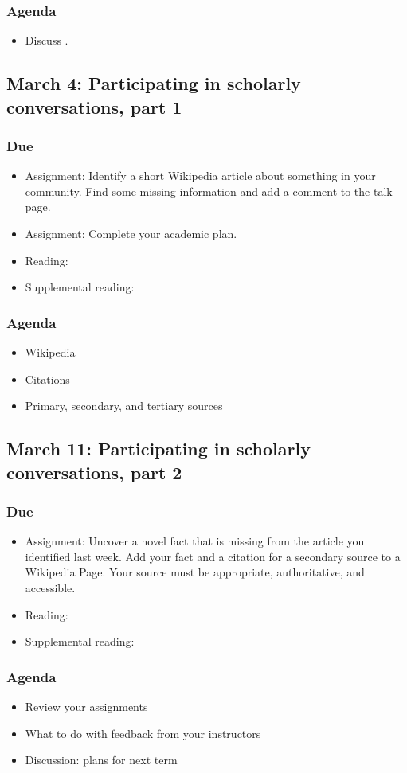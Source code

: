 \documentclass[12pt,article,oneside]{memoir}
\begin{document}
\subsubsection{Agenda}
\begin{itemize}
\item Discuss \cite{guillory2008s}.
\end{itemize}



\subsection{March 4: Participating in scholarly conversations, part 1}
\subsubsection{Due}
\begin{itemize}
 \item Assignment: Identify a short Wikipedia article about something in your community.  Find some missing information and add a comment to the talk page.
 \item Assignment: Complete your academic plan.
 \item Reading: \cite{eval}
 \item Supplemental reading: \cite{training}
\end{itemize}

\subsubsection{Agenda}
\begin{itemize}
\item Wikipedia
\item Citations
\item Primary, secondary, and tertiary sources
\end{itemize}


\subsection{March 11: Participating in scholarly conversations, part 2}
\subsubsection{Due}
\begin{itemize}
 \item Assignment: Uncover a novel fact that is missing from the article you identified last week.  Add your fact and a citation for a secondary source to a Wikipedia Page.  Your source must be appropriate, authoritative, and accessible.
 \item Reading: \cite{eryk}
 \item Supplemental reading: \cite{doyle}
\end{itemize}

\subsubsection{Agenda}
\begin{itemize}
\item Review your assignments
\item What to do with feedback from your instructors
\item Discussion: plans for next term
\end{itemize}


\newpage
\renewcommand{\bibname}{Reading list}
{}

\end{document}
